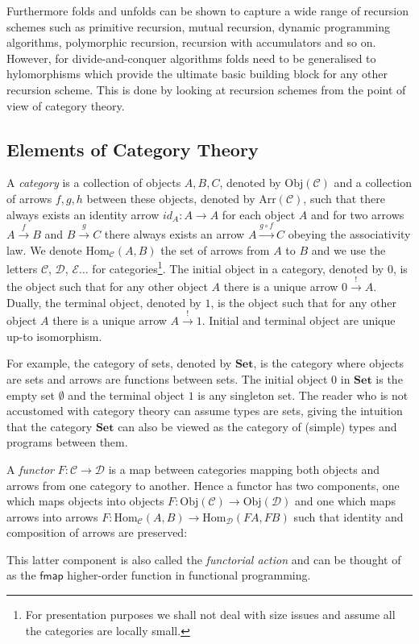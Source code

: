 \documentclass{llncs}
\newcommand{\operator}[1]{\textsf{#1}}
\newcommand{\CatC}{\mathcal{C}}
\newcommand{\CatD}{\mathcal{D}}
\newcommand{\CatE}{\mathcal{E}}
\newcommand{\Set}{\mathbf{Set}}
\newcommand{\Hom}{\text{Hom}}
\newcommand{\Obj}{\text{Obj}}
\newcommand{\Arr}{\text{Arr}}
\begin{document}
Furthermore folds and unfolds can be shown to capture a wide
range of recursion schemes such as primitive recursion, mutual recursion,
dynamic programming algorithms, polymorphic recursion, recursion with
accumulators and so on. However, for divide-and-conquer algorithms folds need to
be generalised to hylomorphisms which provide the ultimate basic building block
for any other recursion scheme. This is done by looking at recursion schemes
from the point of view of category theory.

\subsection{Elements of Category Theory}
A \emph{category} is a collection of objects $A, B, C$, denoted by $\Obj(\CatC)$
and a collection of arrows $f, g, h$ between these objects, denoted by
$\Arr (\CatC)$, such that there always exists an identity arrow
$id_{A} : A \to A$ for each object $A$ and for two arrows $A \xrightarrow{f} B$
and $B \xrightarrow{g} C$ there always exists an arrow
$A \xrightarrow{g\circ f} C$ obeying the associativity law. We denote
$\Hom_{\CatC} (A, B)$ the set of arrows from $A$ to $B$ and we use the letters
$\CatC$, $\CatD$, $\CatE\dots$ for categories\footnote[1]{For presentation
purposes we shall not deal with size issues and assume all the categories are
locally small.}. The initial object in a category, denoted by $0$, is the object such
that for any other object $A$ there is a unique arrow $0 \xrightarrow{!} A$.
Dually, the terminal object, denoted by $1$, is the object such that for any
other object $A$ there is a unique arrow $A \xrightarrow{!} 1$. Initial and
terminal object are unique up-to isomorphism.

For example, the category of sets, denoted by $\Set$, is the category where
objects are sets and arrows are functions between sets. The initial object $0$
in $\Set$ is the empty set $\emptyset$ and the terminal object $1$ is any
singleton set. The reader who is not accustomed with category theory can assume
types are sets, giving the intuition that the category $\Set$ can also be viewed
as the category of (simple) types and programs between them.

A \emph{functor} $F : \CatC \to \CatD$ is a map between categories mapping both
objects and arrows from one category to another. Hence a functor has two
components, one which maps objects into objects
$F : \Obj(\CatC) \to \Obj(\CatD)$ and one which maps arrows into arrows
$F : \Hom_{\CatC}(A, B) \to \Hom_{\CatD} (FA,FB)$ such that identity and
composition of arrows are preserved:
This latter component is also called the \emph{functorial action} and can be
thought of as the $\operator{fmap}$ higher-order function in functional
programming.
\end{document}
